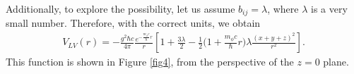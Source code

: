 \documentclass[11pt,showpacs,preprintnumbers,amsmath,amssymb,prd,nofootinbib,superscriptaddress]{revtex4-2}
\begin{document}
Additionally, to explore the possibility, let us assume $b_{ij} = \lambda$, where $\lambda$ is a very small number. Therefore, with the correct units, we obtain
\begin{eqnarray}
    V_{LV}(r)=-\frac{g^2\hbar c}{4\pi}\frac{e^{-\frac{m_{\phi}c}{\hbar}r}}{r}\left[1+\frac{3\lambda}{2}-\frac{1}{2}\biggl(1+\frac{m_\phi c}{\hbar}r\biggr)\lambda\frac{(x+y+z)^2}{r^2}\right].\label{eq27}
\end{eqnarray}
This function is shown in Figure \ref{fig4}, from the perspective of the $z=0$ plane.
\begin{figure}[ht]
    \centering

\end{figure}
\end{document}
